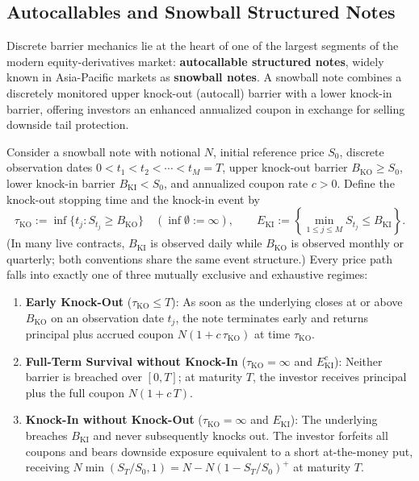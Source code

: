 \subsection{Autocallables and Snowball Structured Notes}

Discrete barrier mechanics lie at the heart of one of the largest segments of the modern equity-derivatives market: \textbf{autocallable structured notes}, widely known in Asia-Pacific markets as \textbf{snowball notes}. A snowball note combines a discretely monitored upper knock-out (autocall) barrier with a lower knock-in barrier, offering investors an enhanced annualized coupon in exchange for selling downside tail protection.

Consider a snowball note with notional $N$, initial reference price $S_0$, discrete observation dates $0 < t_1 < t_2 < \cdots < t_M = T$, upper knock-out barrier $B_{\mathrm{KO}} \ge S_0$, lower knock-in barrier $B_{\mathrm{KI}} < S_0$, and annualized coupon rate $c > 0$. Define the knock-out stopping time and the knock-in event by
\[
\tau_{\mathrm{KO}} := \inf\bigl\{t_j : S_{t_j} \ge B_{\mathrm{KO}}\bigr\} \quad (\inf\emptyset := \infty), \qquad
E_{\mathrm{KI}} := \left\{\min_{1 \le j \le M} S_{t_j} \le B_{\mathrm{KI}}\right\}.
\]
(In many live contracts, $B_{\mathrm{KI}}$ is observed daily while $B_{\mathrm{KO}}$ is observed monthly or quarterly; both conventions share the same event structure.) Every price path falls into exactly one of three mutually exclusive and exhaustive regimes:
\begin{enumerate}
    \item \textbf{Early Knock-Out} ($\tau_{\mathrm{KO}} \le T$): As soon as the underlying closes at or above $B_{\mathrm{KO}}$ on an observation date $t_j$, the note terminates early and returns principal plus accrued coupon $N(1 + c\,\tau_{\mathrm{KO}})$ at time $\tau_{\mathrm{KO}}$.
    \item \textbf{Full-Term Survival without Knock-In} ($\tau_{\mathrm{KO}} = \infty$ and $E_{\mathrm{KI}}^c$): Neither barrier is breached over $[0, T]$; at maturity $T$, the investor receives principal plus the full coupon $N(1 + c\,T)$.
    \item \textbf{Knock-In without Knock-Out} ($\tau_{\mathrm{KO}} = \infty$ and $E_{\mathrm{KI}}$): The underlying breaches $B_{\mathrm{KI}}$ and never subsequently knocks out. The investor forfeits all coupons and bears downside exposure equivalent to a short at-the-money put, receiving $N\min(S_T / S_0, 1) = N - N(1 - S_T / S_0)^+$ at maturity $T$.
\end{enumerate}

